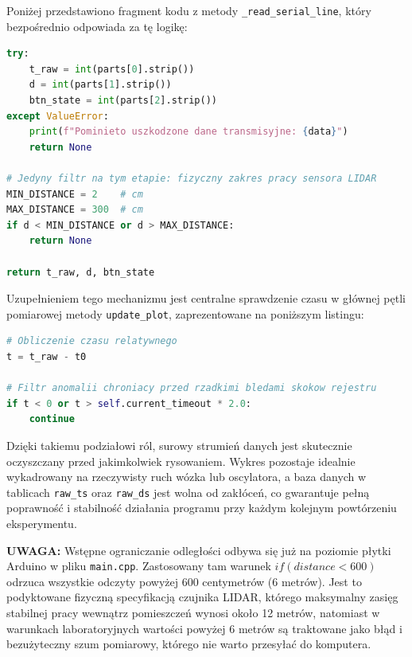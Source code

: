 \documentclass[a4paper,12pt]{article}
\begin{document}
\vspace{0.3cm}
\noindent Poniżej przedstawiono fragment kodu z metody \texttt{\_read\_serial\_line}, który bezpośrednio odpowiada za tę logikę:

\begin{lstlisting}[language=Python]
try:
    t_raw = int(parts[0].strip())
    d = int(parts[1].strip())
    btn_state = int(parts[2].strip())
except ValueError:
    print(f"Pominieto uszkodzone dane transmisyjne: {data}")
    return None

# Jedyny filtr na tym etapie: fizyczny zakres pracy sensora LIDAR
MIN_DISTANCE = 2    # cm
MAX_DISTANCE = 300  # cm
if d < MIN_DISTANCE or d > MAX_DISTANCE:
    return None

return t_raw, d, btn_state
\end{lstlisting}

\vspace{0.3cm}
\noindent Uzupełnieniem tego mechanizmu jest centralne sprawdzenie czasu w głównej pętli pomiarowej metody \texttt{update\_plot}, zaprezentowane na poniższym listingu:
\vspace{0.3cm}

\begin{lstlisting}[language=Python]
# Obliczenie czasu relatywnego
t = t_raw - t0

# Filtr anomalii chroniacy przed rzadkimi bledami skokow rejestru
if t < 0 or t > self.current_timeout * 2.0:
    continue
\end{lstlisting}

\vspace{0.3cm}
\noindent Dzięki takiemu podziałowi ról, surowy strumień danych jest skutecznie oczyszczany przed jakimkolwiek rysowaniem. Wykres pozostaje idealnie wykadrowany na rzeczywisty ruch wózka lub oscylatora, a baza danych w tablicach \texttt{raw\_ts} oraz \texttt{raw\_ds} jest wolna od zakłóceń, co gwarantuje pełną poprawność i stabilność działania programu przy każdym kolejnym powtórzeniu eksperymentu.

\vspace{0.3cm}
\noindent \textbf{UWAGA:} Wstępne ograniczanie odległości odbywa się już na poziomie płytki Arduino w pliku \texttt{main.cpp}. Zastosowany tam warunek $if (distance < 600)$ odrzuca wszystkie odczyty powyżej 600 centymetrów (6 metrów). Jest to podyktowane fizyczną specyfikacją czujnika LIDAR, którego maksymalny zasięg stabilnej pracy wewnątrz pomieszczeń wynosi około 12 metrów, natomiast w warunkach laboratoryjnych wartości powyżej 6 metrów są traktowane jako błąd i bezużyteczny szum pomiarowy, którego nie warto przesyłać do komputera.
\end{document}

